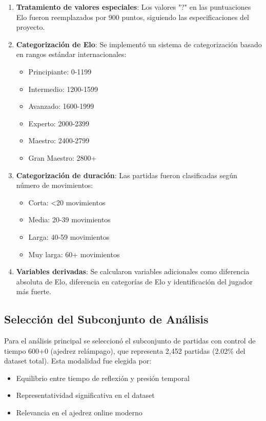 \documentclass[runningheads]{llncs}
\begin{document}
\begin{enumerate}
\item \textbf{Tratamiento de valores especiales}: Los valores "?" en las puntuaciones Elo fueron reemplazados por 900 puntos, siguiendo las especificaciones del proyecto.

\item \textbf{Categorización de Elo}: Se implementó un sistema de categorización basado en rangos estándar internacionales:
\begin{itemize}
\item Principiante: 0-1199
\item Intermedio: 1200-1599  
\item Avanzado: 1600-1999
\item Experto: 2000-2399
\item Maestro: 2400-2799
\item Gran Maestro: 2800+
\end{itemize}

\item \textbf{Categorización de duración}: Las partidas fueron clasificadas según número de movimientos:
\begin{itemize}
\item Corta: <20 movimientos
\item Media: 20-39 movimientos
\item Larga: 40-59 movimientos
\item Muy larga: 60+ movimientos
\end{itemize}

\item \textbf{Variables derivadas}: Se calcularon variables adicionales como diferencia absoluta de Elo, diferencia en categorías de Elo y identificación del jugador más fuerte.
\end{enumerate}

\subsection{Selección del Subconjunto de Análisis}

Para el análisis principal se seleccionó el subconjunto de partidas con control de tiempo 600+0 (ajedrez relámpago), que representa 2,452 partidas (2.02\% del dataset total). Esta modalidad fue elegida por:

\begin{itemize}
\item Equilibrio entre tiempo de reflexión y presión temporal
\item Representatividad significativa en el dataset
\item Relevancia en el ajedrez online moderno
\end{itemize}
\end{document}
